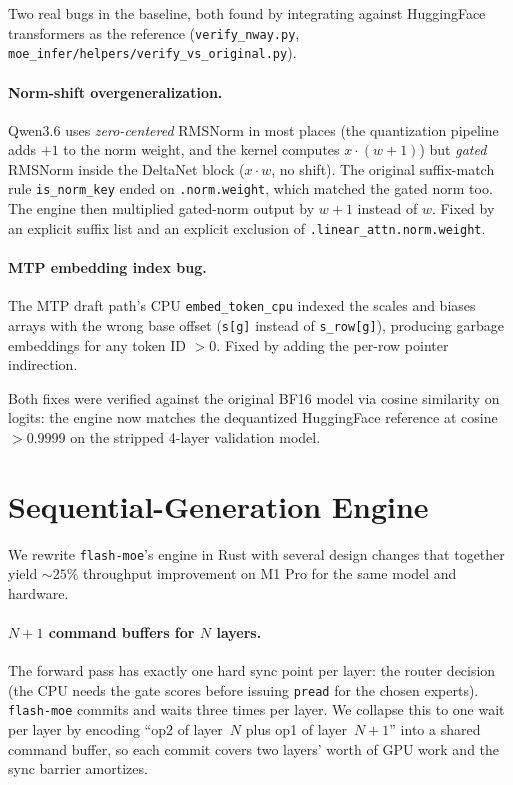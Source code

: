 \documentclass[11pt,a4paper]{article}
\begin{document}
Two real bugs in the baseline, both found by integrating against
HuggingFace transformers as the reference (\texttt{verify\_nway.py},
\texttt{moe_infer/helpers/verify\_vs\_original.py}).

\paragraph{Norm-shift overgeneralization.} Qwen3.6 uses
\emph{zero-centered} RMSNorm in most places (the quantization pipeline
adds $+1$ to the norm weight, and the kernel computes $x \cdot (w + 1)$)
but \emph{gated} RMSNorm inside the DeltaNet block ($x \cdot w$, no
shift). The original suffix-match rule
\texttt{is\_norm\_key} ended on \texttt{.norm.weight}, which matched
the gated norm too. The engine then multiplied gated-norm output by
$w{+}1$ instead of $w$. Fixed by an explicit suffix list and an
explicit exclusion of \texttt{.linear\_attn.norm.weight}.

\paragraph{MTP embedding index bug.} The MTP draft path's CPU
\texttt{embed\_token\_cpu} indexed the scales and biases arrays with
the wrong base offset (\texttt{s[g]} instead of \texttt{s\_row[g]}),
producing garbage embeddings for any token ID $> 0$. Fixed by adding
the per-row pointer indirection.

Both fixes were verified against the original BF16 model via cosine
similarity on logits: the engine now matches the dequantized
HuggingFace reference at cosine $> 0.9999$ on the stripped 4-layer
validation model.

\section{Sequential-Generation Engine}\label{sec:seq}

We rewrite \texttt{flash-moe}'s engine in Rust with several design
changes that together yield $\sim 25\%$ throughput improvement on M1
Pro for the same model and hardware.

\paragraph{$N{+}1$ command buffers for $N$ layers.} The forward pass
has exactly one hard sync point per layer: the router decision (the CPU
needs the gate scores before issuing \texttt{pread} for the chosen
experts). \texttt{flash-moe} commits and waits three times per layer.
We collapse this to one wait per layer by encoding ``op2 of layer~$N$
plus op1 of layer~$N{+}1$'' into a shared command buffer, so each
commit covers two layers' worth of GPU work and the sync barrier
amortizes.
\end{document}
